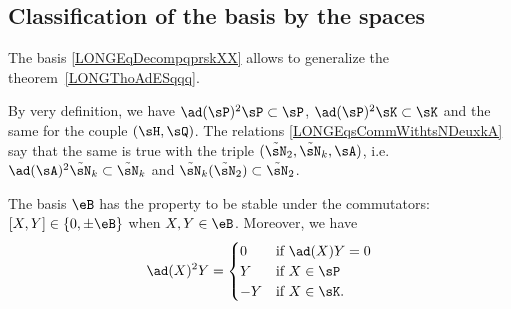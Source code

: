 %
\subsection{Classification of the basis by the spaces}
%

The basis \eqref{LONGEqDecompqprskXX} allows to generalize the theorem~\ref{LONGThoAdESqqq}.

By very definition, we have $\ad(\sP)^2\sP\subset\sP$, $\ad(\sP)^2\sK\subset\sK$ and the same for the couple $(\sH,\sQ)$. The relations \eqref{LONGEqsCommWithtsNDeuxkA} say that the same is true with the triple $(\tilde\sN_2,\tilde\sN_k,\sA)$, i.e. $\ad(\sA)^2\tilde\sN_k\subset\tilde\sN_k$ and $\tilde\sN_k(\tilde\sN_2)\subset\tilde\sN_2$.

\begin{theorem}		\label{LONGThoAdSqIouZero}
	The basis $\eB$ has the property to be stable under the commutators: $[X,Y]\in\{0,\pm\eB\}$ when $X,Y\in\eB$. Moreover, we have
	\begin{equation}		\label{LONGEqadXsqYzYmY}
		\ad(X)^2Y=\begin{cases}
			0  & \text{if }\ad(X)Y=0 \\
			Y  & \text{if }X\in\sP   \\
			-Y & \text{if }X\in\sK.
		\end{cases}
	\end{equation}
\end{theorem}

